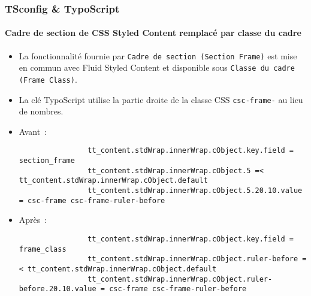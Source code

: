 \begin{frame}[fragile]
	\frametitle{TSconfig \& TypoScript}
	\framesubtitle{Cadre de section de CSS Styled Content remplacé par classe du cadre}

	\lstset{basicstyle=\tiny\ttfamily}

	\begin{itemize}
		\item La fonctionnalité fournie par \texttt{Cadre de section (Section Frame)}
			est mise en commun avec Fluid Styled Content et disponible sous \texttt{Classe du cadre
			(Frame Class)}.
		\item La clé TypoScript utilise la partie droite de la classe CSS \texttt{csc-frame-}
			au lieu de nombres.
		\item Avant~:

			\begin{lstlisting}
				tt_content.stdWrap.innerWrap.cObject.key.field = section_frame
				tt_content.stdWrap.innerWrap.cObject.5 =< tt_content.stdWrap.innerWrap.cObject.default
				tt_content.stdWrap.innerWrap.cObject.5.20.10.value = csc-frame csc-frame-ruler-before
			\end{lstlisting}

		\item Après~:

			\begin{lstlisting}
				tt_content.stdWrap.innerWrap.cObject.key.field = frame_class
				tt_content.stdWrap.innerWrap.cObject.ruler-before =< tt_content.stdWrap.innerWrap.cObject.default
				tt_content.stdWrap.innerWrap.cObject.ruler-before.20.10.value = csc-frame csc-frame-ruler-before
			\end{lstlisting}

	\end{itemize}

\end{frame}

